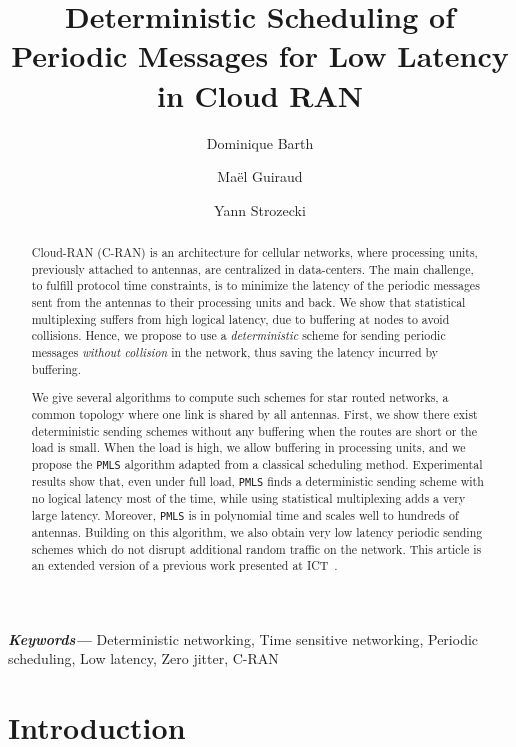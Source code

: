 \documentclass[a4paper,10pt]{journal}
\title{Deterministic Scheduling of Periodic Messages for Low Latency in Cloud RAN}
\author[1]{Dominique Barth}
\author[2]{Ma\"el Guiraud}
\author[1]{Yann Strozecki}
\affil[1]{DAVID Laboratory, UVSQ, Versailles, FRANCE}
\affil[2]{LINEACT Laboratory, CESI, Nanterre, FRANCE}
\newcommand\PMLS{\texttt{PMLS}\xspace}
\providecommand{\keywords}[1]
{
  \small	
  \textbf{\textit{Keywords---}} #1
}
\begin{document}
\maketitle

\begin{abstract}
Cloud-RAN (C-RAN) is an architecture for cellular networks, where processing units, previously attached to antennas, are centralized in data-centers. The main challenge, to fulfill protocol time constraints, is to minimize the latency of the periodic messages sent from the antennas to their processing units and back. We show that statistical multiplexing suffers from high logical latency, due to buffering at nodes to avoid collisions. Hence, we propose to use a \emph{deterministic} scheme for sending periodic messages \emph{without collision} in the network, thus saving the latency incurred by buffering.

We give several algorithms to compute such schemes for star routed networks, a common topology where one link is shared by all antennas. First, we show there exist deterministic sending schemes without any buffering when the routes are short or the load is small. When the load is high, we allow buffering in processing units, and we propose the \PMLS algorithm adapted from a classical scheduling method. Experimental results show that, even under full load, \PMLS finds a deterministic sending scheme with no logical latency most of the time, while using statistical multiplexing adds a very large latency. Moreover, \PMLS is in polynomial time and scales well to hundreds of antennas. Building on this algorithm, we also obtain very low latency periodic sending schemes which do not disrupt additional random traffic on the network. This article is an extended version of a previous work presented at ICT~\cite{Guir1806:Deterministic}.
\end{abstract}
\keywords{Deterministic networking, Time sensitive networking, Periodic scheduling, Low latency, Zero jitter, C-RAN}

\section{Introduction}
\end{document}
